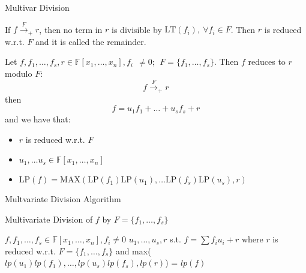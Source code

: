 \documentclass[xcolor=dvipsnames]{beamer}
\newcommand{\F}{{\mathbb{F}}}
\begin{document}
\begin{frame}{{\large Multivar Division}}

\begin{Definition}
If $f\stackrel{F}{\textstyle\longrightarrow}_+ r$, then no term in $r$
is divisible by $\text{LT}(f_i), ~ \forall f_i \in F$. Then $r$ is
reduced w.r.t. $F$ and it is called the remainder.
\end{Definition}

\begin{Definition}
Let $f, f_1, \dots, f_s, r \in \F[x_1, \dots, x_n], f_i ~~ \neq 0; ~~ F
= \{f_1, \dots, f_s\}$. Then $f$ reduces to $r$ modulo $F$:
\[
f\stackrel{F}{\textstyle\longrightarrow}_+ r
\]
then
\[
f = u_1 f_1 + \dots + u_s f_s + r
\]
and we have that:
\begin{itemize}

\item $r$ is reduced w.r.t. $F$
\item $u_1, \dots u_s \in \F[x_1, \dots, x_n]$
\item $\text{LP}(f) = \text{MAX}(\text{LP}(f_1)\text{LP}(u_1), \dots
  \text{LP}(f_s)\text{LP}(u_s), r)$
\end{itemize}
\end{Definition}

\end{frame}




\begin{frame}{{\large Multvariate Division Algorithm }}

 \begin{algorithm}[H]
 \caption{Multivariate Division of $f$ by $F=\{f_1,\dots,f_s\}$}
 \label{algo:mv_reduce}
 \begin{algorithmic}[1]

 \REQUIRE $f, f_1, \dots, f_s \in \F[x_1, \dots, x_n], f_i\neq 0$
 \ENSURE $u_1,\dots, u_s, r$ s.t. $f = \sum f_i u_i+r$ where $r$ is
 reduced w.r.t. $F = \{f_1,\dots, f_s\}$ and max($lp(u_1)lp(f_1), \dots, lp(u_s)lp(f_s), lp(r)$) = $lp(f)$
 \ELSE
 \ENDIF
 \ENDWHILE
 \end{algorithmic}
 \end{algorithm}
\end{frame}
\end{document}
